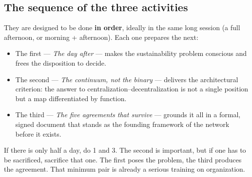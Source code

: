 \documentclass[11pt, a4paper]{article}
\begin{document}
\subsection*{The sequence of the three activities}

They are designed to be done \textbf{in order}, ideally in the same long session (a full afternoon, or morning + afternoon). Each one prepares the next:

\begin{itemize}
  \item The first --- \emph{The day after} --- makes the sustainability problem conscious and frees the disposition to decide.
  \item The second --- \emph{The continuum, not the binary} --- delivers the architectural criterion: the answer to centralization--decentralization is not a single position but a map differentiated by function.
  \item The third --- \emph{The five agreements that survive} --- grounds it all in a formal, signed document that stands as the founding framework of the network before it exists.
\end{itemize}

If there is only half a day, do 1 and 3. The second is important, but if one has to be sacrificed, sacrifice that one. The first poses the problem, the third produces the agreement. That minimum pair is already a serious training on organization.

\vspace{1.5em}
\end{document}
